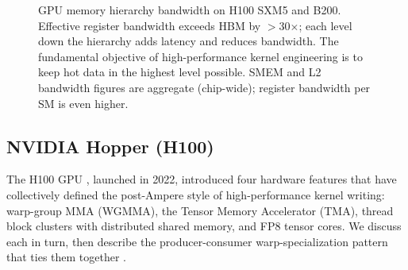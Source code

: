 \documentclass[10pt]{article}
\begin{document}
\begin{figure}[t]
\caption{GPU memory hierarchy bandwidth on H100 SXM5 and B200. Effective register bandwidth exceeds HBM by $>$30$\times$; each level down the hierarchy adds latency and reduces bandwidth. The fundamental objective of high-performance kernel engineering is to keep hot data in the highest level possible. SMEM and L2 bandwidth figures are aggregate (chip-wide); register bandwidth per SM is even higher.}
\label{fig:mem-hierarchy}
\end{figure}

\subsection{NVIDIA Hopper (H100)}
\label{sec:hw-hopper}

The H100 GPU \citep{nvidia2022hopper}, launched in 2022, introduced four hardware features that have collectively defined the post-Ampere style of high-performance kernel writing: warp-group MMA (WGMMA), the Tensor Memory Accelerator (TMA), thread block clusters with distributed shared memory, and FP8 tensor cores. We discuss each in turn, then describe the producer-consumer warp-specialization pattern that ties them together \citep{luo2024hopperdissect}.
\end{document}
